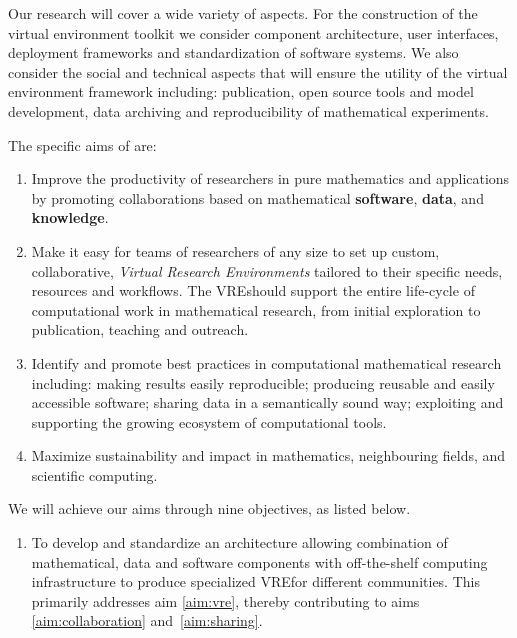 \documentclass[noworkareas,deliverables,\classoptions]{euproposal}       %
\newcommand{\VREs}{VRE}
\begin{document}
\begin{proposal}
Our research will cover a wide variety of aspects. For the
construction of the \TheProject virtual environment toolkit we
consider component architecture, user interfaces, deployment
frameworks and standardization of software systems.  We also consider
the social and technical aspects that will ensure the utility of the
virtual environment framework including: publication, open source
tools and model development, data archiving and reproducibility of
mathematical experiments.

The specific aims of \TheProject are:
\begin{enumerate}
\item \label{aim:collaboration} Improve the productivity of
  researchers in pure mathematics and applications by promoting
  collaborations based on mathematical \textbf{software},
  \textbf{data}, and \textbf{knowledge}.
\item \label{aim:vre} Make it easy for teams of researchers of any
  size to set up custom, collaborative, \emph{Virtual Research
    Environments} tailored to their specific needs, resources and
  workflows. The \VREs should support the entire life-cycle of
  computational work in mathematical research, from initial
  exploration to publication, teaching and outreach.
\item \label{aim:sharing} Identify and promote best practices in
  computational mathematical research including: making results easily
  reproducible; producing reusable and easily accessible
  software; sharing data in a semantically sound way; exploiting and
  supporting the growing ecosystem of computational tools.
\item \label{aim:impact} Maximize sustainability and impact in
  mathematics, neighbouring fields, and scientific computing.
\end{enumerate}

We will achieve our aims through nine objectives, as listed below.

\begin{enumerate}
\item\label{objective:framework} To develop and standardize an
  architecture allowing combination of mathematical, data and software
  components with off-the-shelf computing infrastructure to produce
  specialized \VREs for different communities. 
  This
  primarily addresses aim \ref{aim:vre}, thereby contributing to aims
  \ref{aim:collaboration} and~\ref{aim:sharing}. %


\end{enumerate}
\end{proposal}
\end{document}
